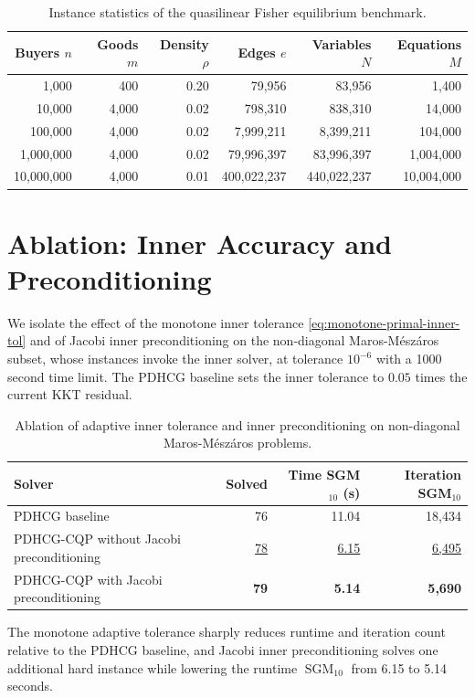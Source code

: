 \documentclass[letterpaper]{article} %
\newcommand{\name}{PDHCG-CQP\xspace}
\theoremstyle{definition}
\theoremstyle{remark}
\newcommand{\papertablesetup}{\small\setstretch{1.0}\renewcommand{\arraystretch}{1.2}}
\begin{document}
\begin{table}[H]
  \centering
  \papertablesetup
  \caption{Instance statistics of the quasilinear Fisher equilibrium
  benchmark.}
  \label{tab:fisher-instances}
  \medskip
  \begin{tabular}{rrrrrr}
    \toprule
    Buyers $n$ & Goods $m$ & Density $\rho$ & Edges $e$ & Variables $N$ & Equations $M$ \\
    \midrule
    1,000      & 400   & 0.20 & 79,956      & 83,956      & 1,400 \\
    10,000     & 4,000 & 0.02 & 798,310     & 838,310     & 14,000 \\
    100,000    & 4,000 & 0.02 & 7,999,211   & 8,399,211   & 104,000 \\
    1,000,000  & 4,000 & 0.02 & 79,996,397  & 83,996,397  & 1,004,000 \\
    10,000,000 & 4,000 & 0.01 & 400,022,237 & 440,022,237 & 10,004,000 \\
    \bottomrule
  \end{tabular}
\end{table}

\section{Ablation: Inner Accuracy and Preconditioning}
\label{app:inner-accuracy-ablation}

We isolate the effect of the monotone inner tolerance
\eqref{eq:monotone-primal-inner-tol} and of Jacobi inner preconditioning on
the non-diagonal Maros-M{\'e}sz{\'a}ros subset, whose instances invoke the
inner solver, at tolerance $10^{-6}$ with a 1000 second time limit. The PDHCG
baseline sets the inner tolerance to $0.05$ times the current KKT residual.

\begin{table}[H]
    \centering
    \papertablesetup
    \caption{Ablation of adaptive inner tolerance and inner preconditioning
    on non-diagonal Maros-M{\'e}sz{\'a}ros problems.}
    \label{tab:adaptive_inner}
    \medskip
    \begin{tabular}{lrrr}
        \toprule
        Solver & Solved & Time SGM$_{10}$ (s) & Iteration SGM$_{10}$ \\
        \midrule
        PDHCG baseline        & 76          & 11.04         & 18,434 \\
        \name without Jacobi preconditioning
                                        & \underline{78} & \underline{6.15} & \underline{6,495} \\
        \name with Jacobi preconditioning
                                        & \textbf{79} & \textbf{5.14} & \textbf{5,690} \\
        \bottomrule
    \end{tabular}
\end{table}

The monotone adaptive tolerance sharply reduces runtime and iteration count
relative to the PDHCG baseline, and Jacobi inner preconditioning solves one
additional hard instance while lowering the runtime
$\operatorname{SGM}_{10}$ from 6.15 to 5.14 seconds.
\end{document}
